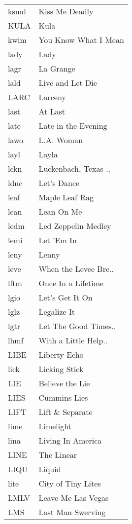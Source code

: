 \begin{supertabular}{ll}
 ksmd &        Kiss Me Deadly \\
 KULA &                  Kula \\
 kwim &  You Know What I Mean \\
 lady &                  Lady \\
 lagr &             La Grange \\
 lald &      Live and Let Die \\
 LARC &               Larceny \\
 last &               At Last \\
 late &   Late in the Evening \\
 lawo &            L.A. Woman \\
 layl &                 Layla \\
 lckn &  Luckenbach, Texas .. \\
 ldnc &           Let's Dance \\
 leaf &        Maple Leaf Rag \\
 lean &            Lean On Me \\
 ledm &   Led Zeppelin Medley \\
 lemi &            Let 'Em In \\
 leny &                 Lenny \\
 leve &  When the Levee Bre.. \\
 lftm &    Once In a Lifetime \\
 lgio &       Let's Get It On \\
 lglz &           Legalize It \\
 lgtr &  Let The Good Times.. \\
 lhmf &  With a Little Help.. \\
 LIBE &          Liberty Echo \\
 lick &         Licking Stick \\
  LIE &       Believe the Lie \\
 LIES &          Cummins Lies \\
 LIFT &       Lift \& Separate \\
 lime &             Limelight \\
 lina &     Living In America \\
 LINE &            The Linear \\
 LIQU &                Liquid \\
 lite &    City of Tiny Lites \\
 LMLV &    Leave Me Las Vegas \\
  LMS &     Last Man Swerving \\

\end{supertabular}

